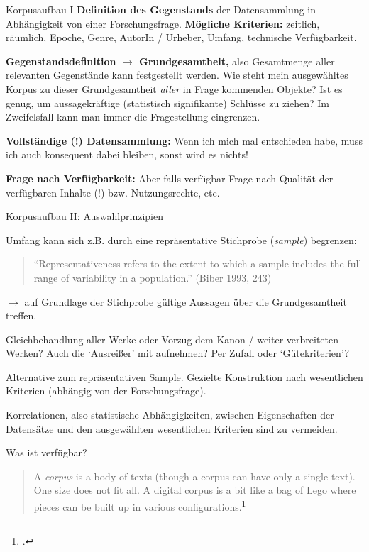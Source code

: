 \documentclass[10pt,a4paper]{article}
\begin{document}
\begin{multicols}{3}
\begin{textbox}{Korpusaufbau I}
\textbf{Definition des Gegenstands} der Datensammlung in Abhängigkeit von einer Forschungsfrage. 
\textbf{Mögliche Kriterien:} zeitlich, räumlich, Epoche, Genre, AutorIn / Urheber, Umfang, technische Verfügbarkeit.

\textbf{Gegenstandsdefinition $\to$ Grundgesamtheit,} also Gesamtmenge aller relevanten Gegenstände kann festgestellt werden. Wie steht mein ausgewähltes Korpus zu dieser Grundgesamtheit \emph{aller} in Frage kommenden Objekte? Ist es genug, um aussagekräftige (statistisch signifikante) Schlüsse zu ziehen? Im Zweifelsfall kann man immer die Fragestellung eingrenzen.

\textbf{Vollständige (!) Datensammlung:} Wenn ich mich mal entschieden habe, muss ich auch konsequent dabei bleiben, sonst wird es nichts!

\textbf{Frage nach Verfügbarkeit:} Aber falls verfügbar Frage nach Qualität der verfügbaren Inhalte (!) bzw. Nutzungsrechte, etc.

\end{textbox}



\begin{textbox}{Korpusaufbau II: Auswahlprinzipien}

Umfang kann sich z.B. durch eine repräsentative Stichprobe (\emph{sample}) begrenzen:
\begin{quote}
``Representativeness refers to the extent to which a sample includes the full range of variability in a population.'' (Biber 1993, 243)
\end{quote}
$\to$ auf Grundlage der Stichprobe gültige Aussagen über die Grundgesamtheit treffen.

Gleichbehandlung aller Werke oder Vorzug dem Kanon / weiter verbreiteten Werken? Auch die `Ausreißer' mit aufnehmen? Per Zufall oder `Gütekriterien'?

 Alternative zum repräsentativen Sample. Gezielte Konstruktion nach wesentlichen Kriterien (abhängig von der Forschungsfrage).

Korrelationen, also statistische Abhängigkeiten, zwischen Eigenschaften der Datensätze und den ausgewählten wesentlichen Kriterien sind zu vermeiden.

 Was ist verfügbar?

\begin{quote}
     A \emph{corpus} is a body of texts (though a corpus can have only a single text). \punkti One size does not fit all.
     \punkti A digital corpus is a bit like a bag of Lego where pieces can be built up in various configurations.\footcite[281--282]{textvisualization}
\end{quote}



\end{textbox}
\end{multicols}
\end{document}

